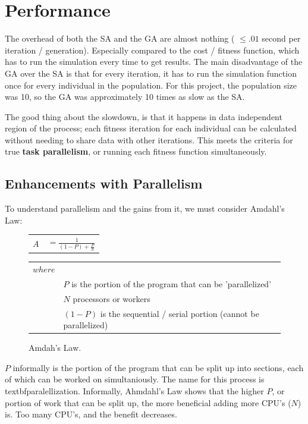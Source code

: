 \section{Performance}
The overhead of both the SA and the GA are almost nothing ( $\le .01$ second per
iteration / generation). Especially compared to the cost / fitness function,
which has to run the simulation every time to get results. The main 
disadvantage of the GA over the SA is that for every iteration, it has to run
the simulation function once for every individual in the population. For this
project, the population size was 10, so the GA was approximately 10 times
as slow as the SA.

The good thing about the slowdown, is that it happens in data independent
region of the process; each fitness iteration for each individual can be 
calculated without needing to share data with other iterations. This meets the
criteria for true \textbf{task parallelism}, or running each fitness function
simultaneously.

\subsection{Enhancements with Parallelism}
To understand parallelism and the gains from it, we must consider Amdahl's Law:
\begin{figure}[h]
	\begin{center}
		\LARGE
		\begin{tabular}{l r}
			$ A $		&	$ = \frac{1}{(1 - P) + \frac{P}{N}} $ \\
		\end{tabular}

		\normalsize
		\begin{tabular}{l l}
			$ where $  & \\
					&	$ P $ is the portion of the program that can be 'parallelized' \\
					&	$ N $ processors or workers \\
					&	$ (1 - P) $ is the sequential / serial portion (cannot be parallelized) \\
		\end{tabular}
		\caption{Amdah's Law. \cite{amdahl}} 
		\label{amdahl}
	\end{center}
\end{figure}
\normalsize

$ P $ informally is the portion of the program that can be split up into sections, each of which can be worked 
on simultaniously. The name for this process is textbf{paralellization}. Informally, Ahmdahl's Law shows that 
the higher $ P $, or portion of work that can be split up, the more beneficial adding more CPU's ($ N $) is. Too many CPU's, and the benefit decreases.

